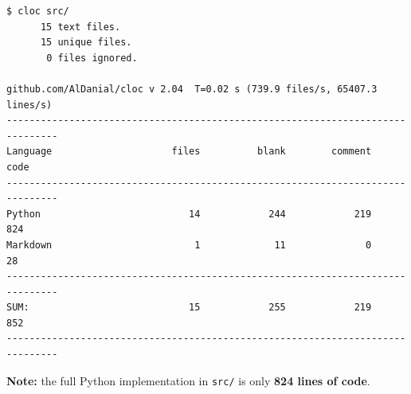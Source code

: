 \begin{frame}

  \vspace{14mm}
\begin{lstlisting}[numbers=none]
$ cloc src/
      15 text files.
      15 unique files.
       0 files ignored.

github.com/AlDanial/cloc v 2.04  T=0.02 s (739.9 files/s, 65407.3 lines/s)
-------------------------------------------------------------------------------
Language                     files          blank        comment           code
-------------------------------------------------------------------------------
Python                          14            244            219            824
Markdown                         1             11              0             28
-------------------------------------------------------------------------------
SUM:                            15            255            219            852
-------------------------------------------------------------------------------
\end{lstlisting}

\vspace{3mm}
{\small \textbf{Note:} the full Python implementation in \texttt{src/} is only \textbf{824 lines of code}.}

  \slideheaderfooter
\end{frame}
